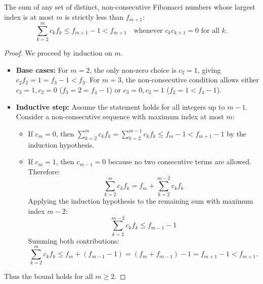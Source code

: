 \documentclass[a4paper]{article}
\begin{document}
\begin{lemma}\label{fib:lem:zeckendorf-bound}
The sum of any set of distinct, non-consecutive Fibonacci numbers whose largest index is at most $m$ is strictly less than $f_{m+1}$:
\begin{equation}
\sum_{k=2}^{m} c_k f_k \leq f_{m+1} - 1 < f_{m+1} \quad \text{whenever } c_k c_{k+1} = 0 \text{ for all } k.
\end{equation}
\end{lemma}

\begin{proof}
We proceed by induction on $m$.
\begin{itemize}[leftmargin=*]
\item \textbf{Base cases:} For $m=2$, the only non-zero choice is $c_2 = 1$, giving $c_2 f_2 = 1 = f_3 - 1 < f_3$. For $m=3$, the non-consecutive condition allows either $c_3=1, c_2=0$ ($f_3 = 2 = f_4 - 1$) or $c_3=0, c_2=1$ ($f_2 = 1 < f_4 - 1$).
\item \textbf{Inductive step:} Assume the statement holds for all integers up to $m-1$. Consider a non-consecutive sequence with maximum index at most $m$:
\begin{itemize}
\item If $c_m = 0$, then $\sum_{k=2}^{m} c_k f_k = \sum_{k=2}^{m-1} c_k f_k \leq f_m - 1 < f_{m+1} - 1$ by the induction hypothesis.
\item If $c_m = 1$, then $c_{m-1} = 0$ because no two consecutive terms are allowed. Therefore:
\begin{equation*}
\sum_{k=2}^{m} c_k f_k = f_m + \sum_{k=2}^{m-2} c_k f_k
\end{equation*}
Applying the induction hypothesis to the remaining sum with maximum index $m-2$:
\begin{equation*}
\sum_{k=2}^{m-2} c_k f_k \leq f_{m-1} - 1
\end{equation*}
Summing both contributions:
\begin{equation*}
\sum_{k=2}^{m} c_k f_k \leq f_m + (f_{m-1} - 1) = (f_m + f_{m-1}) - 1 = f_{m+1} - 1 < f_{m+1}.
\end{equation*}
\end{itemize}
\end{itemize}
Thus the bound holds for all $m \geq 2$.
\end{proof}
\end{document}
